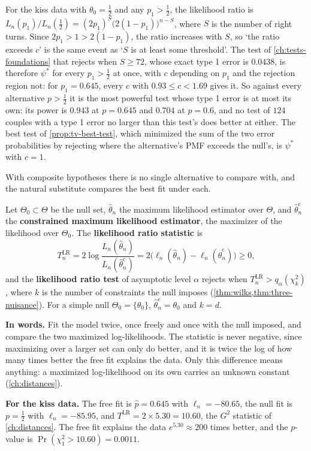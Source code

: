 For the kiss data with $\theta_0 = \frac12$ and any $p_1 > \frac12$, the likelihood ratio is $L_n(p_1)/L_n(\frac12) = (2p_1)^S\big(2(1 - p_1)\big)^{n - S}$, where $S$ is the number of right turns.
Since $2p_1 > 1 > 2(1 - p_1)$, the ratio increases with $S$, so `the ratio exceeds $c$' is the same event as `$S$ is at least some threshold'.
The test of \cref{ch:tests-foundations} that rejects when $S \geq 72$, whose exact type 1 error is $0.0438$, is therefore $\psi^*$ for every $p_1 > \frac12$ at once, with $c$ depending on $p_1$ and the rejection region not: for $p_1 = 0.645$, every $c$ with $0.93 \leq c < 1.69$ gives it.
So against every alternative $p > \frac12$ it is the most powerful test whose type 1 error is at most its own: its power is $0.943$ at $p = 0.645$ and $0.704$ at $p = 0.6$, and no test of $124$ couples with a type 1 error no larger than this test's does better at either.
The best test of \cref{prop:tv-best-test}, which minimized the sum of the two error probabilities by rejecting where the alternative's PMF exceeds the null's, is $\psi^*$ with $c = 1$.

With composite hypotheses there is no single alternative to compare with, and the natural substitute compares the best fit under each.

\begin{definition}
\label{def:lrt}
Let $\Theta_0 \subset \Theta$ be the null set, $\hat{\theta}_n$ the maximum likelihood estimator over $\Theta$, and $\hat{\theta}^{\mathrm{c}}_n$ the \textbf{constrained maximum likelihood estimator}, the maximizer of the likelihood over $\Theta_0$.
The \textbf{likelihood ratio statistic} is
\[
T^{\mathrm{LR}}_n = 2\log\frac{L_n(\hat{\theta}_n)}{L_n(\hat{\theta}^{\mathrm{c}}_n)} = 2\big(\ell_n(\hat{\theta}_n) - \ell_n(\hat{\theta}^{\mathrm{c}}_n)\big) \geq 0,
\]
and the \textbf{likelihood ratio test} of asymptotic level $\alpha$ rejects when $T^{\mathrm{LR}}_n > q_\alpha(\chi^2_k)$, where $k$ is the number of constraints the null imposes (\cref{thm:wilks,thm:three-nuisance}).
For a simple null $\Theta_0 = \{\theta_0\}$, $\hat{\theta}^{\mathrm{c}}_n = \theta_0$ and $k = d$.
\end{definition}

\begin{inwords}
\textbf{In words.} Fit the model twice, once freely and once with the null imposed, and compare the two maximized log-likelihoods. The statistic is never negative, since maximizing over a larger set can only do better, and it is twice the log of how many times better the free fit explains the data. Only this difference means anything: a maximized log-likelihood on its own carries an unknown constant (\cref{ch:distances}).
\par\smallskip
\textbf{For the kiss data.} The free fit is $\hat{p} = 0.645$ with $\ell_n = -80.65$, the null fit is $p = \frac12$ with $\ell_n = -85.95$, and $T^{\mathrm{LR}} = 2 \times 5.30 = 10.60$, the $G^2$ statistic of \cref{ch:distances}. The free fit explains the data $e^{5.30} \approx 200$ times better, and the $p$-value is $\Pr(\chi^2_1 > 10.60) = 0.0011$.
\end{inwords}

